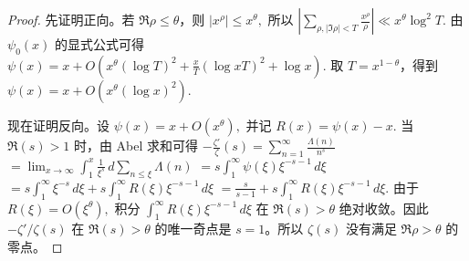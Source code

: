 \begin{proof}
	先证明正向。若 $\Re\rho\leq\theta$，则
	\(\textstyle |x^\rho|\leq\allowbreak{} x^\theta,\allowbreak{}\)
	所以
	\(\textstyle \left| \sum_{\rho,\allowbreak{} |\Im\rho|<T} \frac{x^\rho}{\rho} \right| \ll\allowbreak{} x^\theta\log^2T.\)
	由 $\psi_0(x)$ 的显式公式可得
	\(\textstyle \psi(x) =\allowbreak{} x +\allowbreak{} O\left( x^\theta(\log T)^2 +\allowbreak{} \frac{x}{T}(\log xT)^2 +\allowbreak{} \log x \right).\)
	取 $T=x^{1-\theta}$，得到
	\(\textstyle \psi(x) =\allowbreak{} x+\allowbreak{}O\left(x^\theta(\log x)^2\right).\)

	现在证明反向。设
	\(\textstyle \psi(x)=\allowbreak{}x+\allowbreak{}O(x^\theta),\allowbreak{}\)
	并记
	\(\textstyle R(x)=\allowbreak{}\psi(x)-x.\)
	当 $\Re(s)>1$ 时，由 Abel 求和可得
	\(\textstyle -\frac{\zeta'}{\zeta}(s) =\allowbreak{} \sum_{n=\allowbreak{}1}^{\infty}\frac{\Lambda(n)}{n^s}\) \(\textstyle =\allowbreak{} \lim_{x\to\allowbreak{}\infty} \int_1^x \frac1{\xi^s}\,d\sum_{n\leq\allowbreak{}\xi}\Lambda(n)\) \(\textstyle =\allowbreak{} s\int_1^\infty \psi(\xi)\xi^{-s-1}\,d\xi\) \(\textstyle =\allowbreak{} s\int_1^\infty \xi^{-s}\,d\xi +\allowbreak{} s\int_1^\infty R(\xi)\xi^{-s-1}\,d\xi\) \(\textstyle =\allowbreak{} \frac{s}{s-1} +\allowbreak{} s\int_1^\infty R(\xi)\xi^{-s-1}\,d\xi.\)
	由于
	\(\textstyle R(\xi)=\allowbreak{}O(\xi^\theta),\allowbreak{}\)
	积分
	\(\textstyle \int_1^\infty R(\xi)\xi^{-s-1}\,d\xi\)
	在 $\Re(s)>\theta$ 绝对收敛。因此 $-\zeta'/\zeta(s)$ 在
	$\Re(s)>\theta$ 的唯一奇点是 $s=1$。所以 $\zeta(s)$ 没有满足
	$\Re\rho>\theta$ 的零点。
\end{proof}

